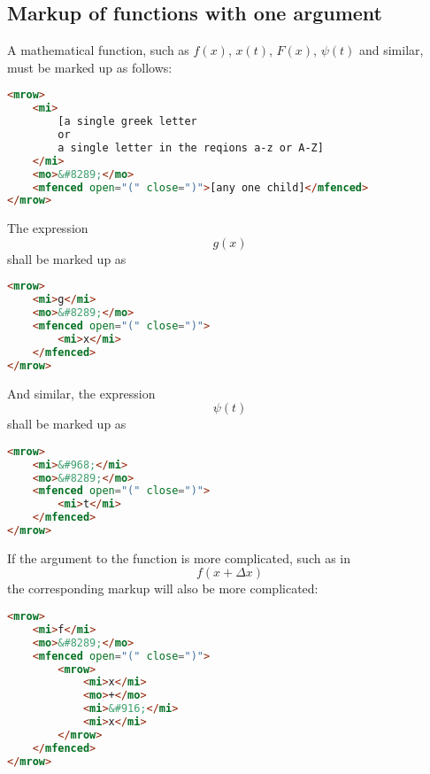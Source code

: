 \documentclass[english,a4paper,11pt]{article}
\begin{document}
\subsection{Markup of functions with one argument}
A mathematical function, such as $f(x)$, $x(t)$, $F(x)$, $\psi (t)$ and similar, must be marked up as follows:
\begin{lstlisting}[language=HTML]
<mrow>
	<mi>
		[a single greek letter 
		or 
		a single letter in the reqions a-z or A-Z]
	</mi>
	<mo>&#8289;</mo>
	<mfenced open="(" close=")">[any one child]</mfenced>
</mrow>
\end{lstlisting}


\begin{eksempler}
	The expression 
	\begin{equation}g(x)\end{equation}
	shall be marked up as
\begin{lstlisting}[language=HTML]
<mrow>
	<mi>g</mi>
	<mo>&#8289;</mo>
	<mfenced open="(" close=")">
		<mi>x</mi>
	</mfenced>
</mrow>
\end{lstlisting}

And similar, the expression 
\begin{equation}\psi(t)\end{equation}
shall be marked up as
\begin{lstlisting}[language=HTML]
<mrow>
	<mi>&#968;</mi>
	<mo>&#8289;</mo>
	<mfenced open="(" close=")">
		<mi>t</mi>
	</mfenced>
</mrow>
\end{lstlisting}

If the argument to the function is more complicated, such as in 
\begin{equation}f(x + \Delta x)\end{equation} 
the corresponding markup will also be more complicated:
\begin{lstlisting}[language=HTML]
<mrow>
	<mi>f</mi>
	<mo>&#8289;</mo>
	<mfenced open="(" close=")">
		<mrow>
			<mi>x</mi>
			<mo>+</mo>
			<mi>&#916;</mi>
			<mi>x</mi>
		</mrow>
	</mfenced>
</mrow>
\end{lstlisting}

\end{eksempler}
\end{document}
